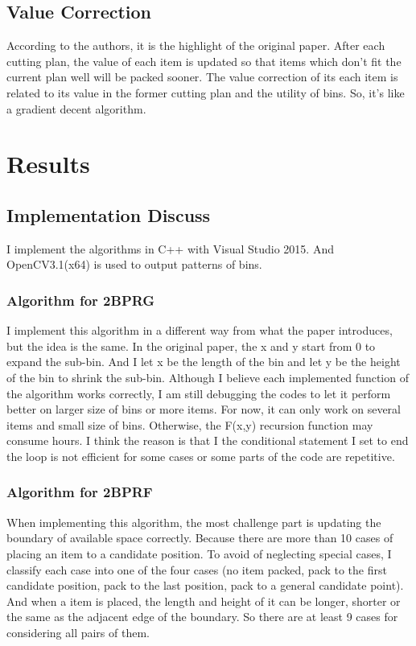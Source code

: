 \documentclass[11pt]{article}
\begin{document}
    \subsection{Value Correction}
    According to the authors, it is the highlight of the original paper. After each cutting plan, the value of each item is updated so that items which don't fit the current plan well will be packed sooner. The value correction of its each item is related to its value in the former cutting plan and the utility of bins. So, it's like a gradient decent algorithm.
\section{Results}
    \subsection{Implementation Discuss}
    I implement the algorithms in C++ with Visual Studio 2015. And OpenCV3.1(x64) is used to output patterns of bins.
        \subsubsection{Algorithm for 2BPRG}
        I implement this algorithm in a different way from what the paper introduces, but the idea is the same. In the original paper, the x and y start from 0 to expand the sub-bin. And I let x be the length of the bin and let y be the height of the bin to shrink the sub-bin.
        \newline
        Although I believe each implemented function of the algorithm works correctly, I am still debugging the codes to let it perform better on larger size of bins or more items. For now, it can only work on several items and small size of bins. Otherwise, the F(x,y) recursion function may consume hours. I think the reason is that I the conditional statement I set to end the loop is not efficient for some cases or some parts of the code are repetitive.
        \subsubsection{Algorithm for 2BPRF}
        When implementing this algorithm, the most challenge part is updating the boundary of available space correctly. Because there are more than 10 cases of placing an item to a candidate position. To avoid of neglecting special cases, I classify each case into one of the four cases (no item packed, pack to the first candidate position, pack to the last position, pack to a general candidate point). And when a item is placed, the length and height of it can be longer, shorter or the same as the adjacent edge of the boundary. So there are at least 9 cases for considering all pairs of them.
\end{document}
